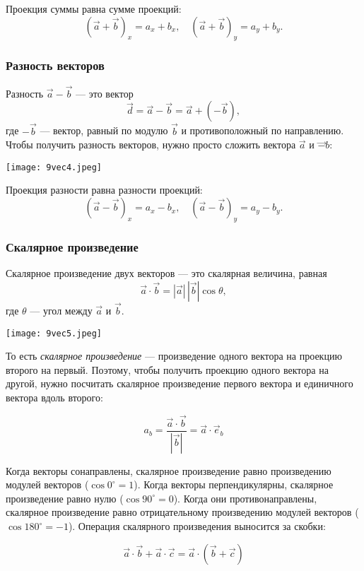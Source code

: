 \documentclass[12pt, a4paper]{article}%
\begin{document}
Проекция суммы равна сумме проекций:
\[
(\vec a + \vec b)_x = a_x + b_x,\quad (\vec a + \vec b)_y = a_y + b_y.
\]

\subsubsection*{Разность векторов}
Разность $\vec a - \vec b$ — это вектор
\[
\vec d = \vec a - \vec b = \vec a + (-\vec b),
\]
где $-\vec b$ — вектор, равный по модулю $\vec b$ и противоположный по направлению.  
Чтобы получить разность векторов, нужно просто сложить вектора $\vec a$ и $\vec -b$:

\begin{center}
\texttt{[image: 9vec4.jpeg]}
\label{fig:mpr}
\end{center}

Проекция разности равна разности проекций:
\[
(\vec a - \vec b)_x = a_x - b_x,\quad (\vec a - \vec b)_y = a_y - b_y.
\]

\subsubsection*{Скалярное произведение }
Скалярное произведение двух векторов — это скалярная величина, равная
\[
\vec a \cdot \vec b = |\vec a|\,|\vec b|\cos\theta,
\]
где $\theta$ — угол между $\vec a$ и $\vec b$.


\begin{center}
\texttt{[image: 9vec5.jpeg]}
\label{fig:mpr}
\end{center}

То есть \textit{скалярное произведение} --- произведение одного вектора на проекцию второго на первый. Поэтому, чтобы получить проекцию одного вектора на другой, нужно посчитать скалярное произведение первого вектора и единичного вектора вдоль второго:

\[
a_b = \frac{\vec a \cdot \vec b}{|\vec b|} = \vec a \cdot \vec e_b
\]




Когда векторы сонаправлены,
скалярное произведение равно произведению модулей векторов ($\cos 0 ^\circ = 1$). Когда векторы перпендикулярны,
скалярное произведение равно нулю ($\cos 90^\circ = 0$). Когда они противонаправлены, скалярное 
произведение равно отрицательному произведению модулей векторов ($\cos 180^\circ = -1$). Операция скалярного произведения выносится за скобки:

\[
\vec a \cdot \vec b + \vec a \cdot \vec c = \vec a \cdot(\vec b+\vec c)
\]
\end{document}
